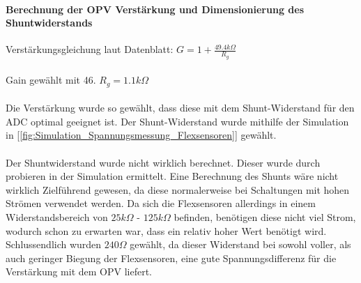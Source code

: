 \documentclass[titlepage,12pt,twoside]{article}
\begin{document}
\paragraph{Berechnung der OPV Verstärkung und Dimensionierung des Shuntwiderstands}
\hfill \break
\hfill \break
\hspace*{1cm} Verstärkungsgleichung laut Datenblatt: $ G = 1+\frac{49.4k\Omega}{R_{g}} $ \\
\\
\hspace*{1cm} Gain gewählt mit 46. \hspace*{1cm} $ R_{g} = 1.1k\Omega $ \\
\\
Die Verstärkung wurde so gewählt, dass diese mit dem Shunt-Widerstand für den ADC optimal geeignet ist.
Der Shunt-Widerstand wurde mithilfe der Simulation in [\textcolor{blue}{\autoref{fig:Simulation_Spannungsmessung_Flexsensoren}}]
gewählt. \\
\\
Der Shuntwiderstand wurde nicht wirklich berechnet. Dieser wurde durch probieren in der Simulation ermittelt. Eine Berechnung
des Shunts wäre nicht wirklich Zielführend gewesen, da diese normalerweise bei Schaltungen mit hohen Strömen verwendet werden. 
Da sich die Flexsensoren allerdings in einem Widerstandsbereich von $25k\Omega$ - $125k\Omega$ befinden, benötigen diese nicht
viel Strom, wodurch schon zu erwarten war, dass ein relativ hoher Wert benötigt wird. Schlussendlich wurden $240\Omega$ gewählt,
da dieser Widerstand bei sowohl voller, als auch geringer Biegung der Flexsensoren, eine gute Spannungsdifferenz für die 
Verstärkung mit dem OPV liefert. \\
\\
\end{document}
